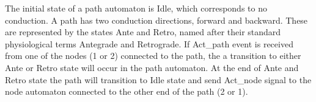 The initial state of a path automaton is \textsf{Idle}, which corresponds to no conduction. 
A path has two conduction directions, forward and backward.
These are represented by the states Ante and Retro, named after their standard physiological terms Antegrade and Retrograde.
If \textsf{Act\_path} event is received from one of the nodes (1 or 2) connected to the path, the a transition to either \textsf{Ante} or \textsf{Retro} state will occur in the path automaton. 
At the end of \textsf{Ante} and \textsf{Retro} state the path will transition to \textsf{Idle} state and send Act\_node signal to the node automaton connected to the other end of the path (2 or 1).
%
 
